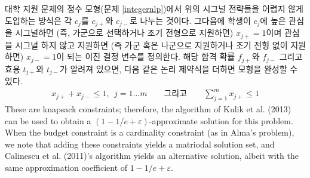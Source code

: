 \documentclass[11pt]{article} %
\newif\ifen
\theoremstyle{definition}
\theoremstyle{definition}
\begin{document}
\ifen
In the integer formulation of the college application problem (Problem \ref{integernlp}), a natural way to model these signaling strategies without introducing too much complexity is to split each $c_j$ into $c_{j+}$ and $c_{j-}$. The binary decision variables are $x_{j+} = 1$ if the student applies to $c_j$ with high priority (that is, in  the \emph{ga} or \emph{na} field or with early decision) and $x_{j-} = 1$ if applying with low priority (that is, in the \emph{da} field or without early decision). Now, assuming that the differential admission probabilities $f_{j+}$ and $f_{j-}$ and utilities $t_{j+}$ and $t_{j-}$ are known, adding the logical constraints 
\begin{align}
 x_{j+} + x_{j-} \leq 1, ~~ j = 1\dots m\qquad\text{and}\qquad\sum_{j=1}^m x_{j+} \leq 1
\end{align}
completes the formulation. These are knapsack constraints; therefore, the algorithm of Kulik et al. (2013) can be used to obtain a $(1 - 1/e + \varepsilon)$-approximate solution for this problem. When the budget constraint is a cardinality constraint (as in Alma's problem), we note that adding these constraints yields a matriodal solution set, and Calinescu et al. (2011)'s algorithm yields an alternative solution, albeit with the same approximation coefficient of $1 - 1/e + \varepsilon$. %
\else
대학 지원 문제의 정수 모형(문제 \ref{integernlp})에서 위의 시그널 전략들을 어렵지 않게 도입하는 방식은 각 $c_j$를 $c_{j+}$와 $c_{j-}$로 나누는 것이다. 그다음에 학생이 $c_j$에 높은 관심을 시그널하면 (즉, 가군으로 선택하거나 조기 전형으로 지원하면) $x_{j+} = 1$이며 관심을 시그널 하지 않고 지원하면 (즉 가군 혹은 나군으로 지원하거나 조기 전형 없이 지원하면) $x_{j-} = 1$이 되는 이진 결정 변수를 정의한다. 해당 합격 확률 $f_{j+}$와 $f_{j-}$ 그리고 효용  $t_{j+}$와 $t_{j-}$가 알려져 있으면, 다음 같은 논리 제약식을 더하면 모형을 완성할 수 있다. 
\begin{align}
 x_{j+} + x_{j-} \leq 1, ~~ j = 1\dots m\qquad\text{그리고}\qquad\sum_{j=1}^m x_{j+} \leq 1
\end{align}
These are knapsack constraints; therefore, the algorithm of Kulik et al. (2013) can be used to obtain a $(1 - 1/e + \varepsilon)$-approximate solution for this problem. When the budget constraint is a cardinality constraint (as in Alma's problem), we note that adding these constraints yields a matriodal solution set, and Calinescu et al. (2011)'s algorithm yields an alternative solution, albeit with the same approximation coefficient of $1 - 1/e + \varepsilon$.
\fi
\end{document}
